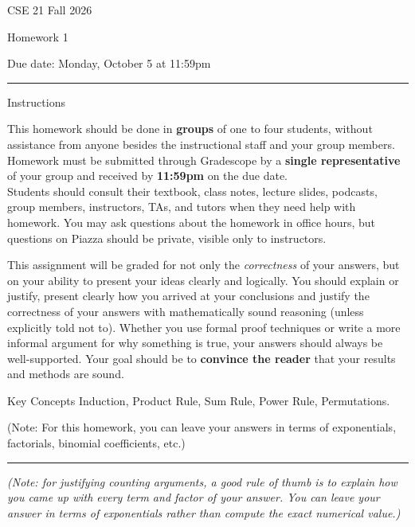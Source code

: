 \documentclass[10pt,letterpaper,unboxed,cm]{article}
\begin{document}
\hfill{CSE 21 Fall 2026}

\hfill{Homework 1}

\hfill{Due date: Monday, October 5 at 11:59pm}

\begin{center}
\begin{minipage}[t]{5.7in}
\rule{\linewidth}{2pt}
{\sc Instructions}\newline

This homework should be done in {\bf groups} of one to four students, without assistance from anyone besides the instructional staff and your group members.  Homework must be submitted through Gradescope by a {\bf single representative} of your group and received by {\bf 11:59pm} on the due date.\\
 

Students should consult their textbook, class notes, lecture slides, podcasts, group members, instructors, TAs, and tutors when 
they need help with homework. You may ask questions about the homework in office hours, but questions on Piazza should be private, visible only to instructors. 

This assignment will be graded for not only the \emph{correctness} of your answers, but on your ability to present your ideas clearly and logically. You should explain or justify, present clearly how you arrived at your conclusions and justify the correctness of your answers with mathematically sound reasoning (unless explicitly told not to). Whether you use formal proof techniques or write a more informal argument for why something is true, your answers should always be well-supported. Your goal should be to {\bf convince the reader} that your results and methods are sound.






{\sc Key Concepts} Induction, Product Rule, Sum Rule, Power Rule, Permutations.

(Note: For this homework, you can leave your answers in terms of exponentials, factorials, binomial coefficients, etc.)

\rule{\linewidth}{2pt}
\end{minipage} \hfill

\end{center}

\emph{(Note: for justifying counting arguments, a good rule of thumb is to explain how you came up with every term and factor of your answer. You can leave
your answer in terms of exponentials rather than compute the exact numerical value.)}
\end{document}
